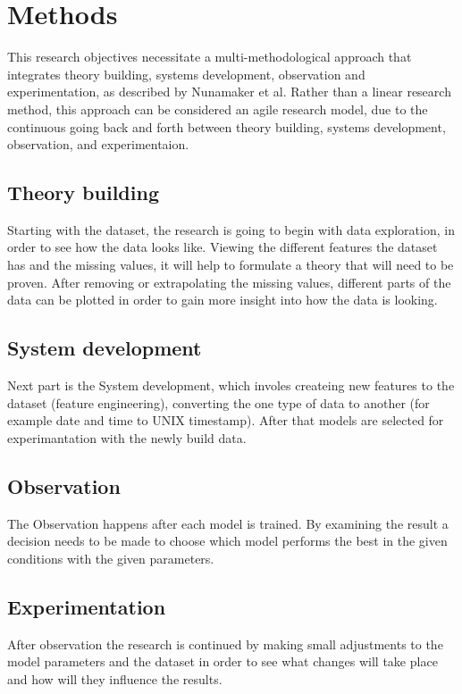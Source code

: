 \documentclass[a4paper, twocolumn]{article}
\begin{document}
\section{Methods}

This research objectives necessitate a multi-methodological approach that integrates theory building, systems development, observation and experimentation, as described by Nunamaker et al\cite{nunamaker1990systems}.
Rather than a linear research method, this approach can be considered an agile research model, due to the continuous going back and forth between theory building, systems development, observation, and experimentaion.

\subsection{Theory building}
\label{theorybuilding}
    Starting with the dataset\cite{dataset}, the research is going to begin with data exploration,
    in order to see how the data looks like. Viewing the different features the dataset has and the missing
    values, it will help to formulate a theory that will need to be proven.
    After removing or extrapolating the missing values, different parts of the data can be plotted in order
    to gain more insight into how the data is looking.
\subsection{System development}
\label{systemdevelopment}
    Next part is the System development, which involes createing new features to the dataset (feature engineering),
    converting the one type of data to another (for example date and time to UNIX timestamp).
    After that models are selected for experimantation with the newly build data.
\subsection{Observation}
\label{observation}
    The Observation happens after each model is trained. By examining the result a decision needs to be made
    to choose  which model performs the best in the given conditions with the given parameters.
\subsection{Experimentation}
\label{experimentation}
    After observation the research is continued by making small adjustments to the model parameters and the dataset
    in order to see what changes will take place and how will they influence the results.
\end{document}
